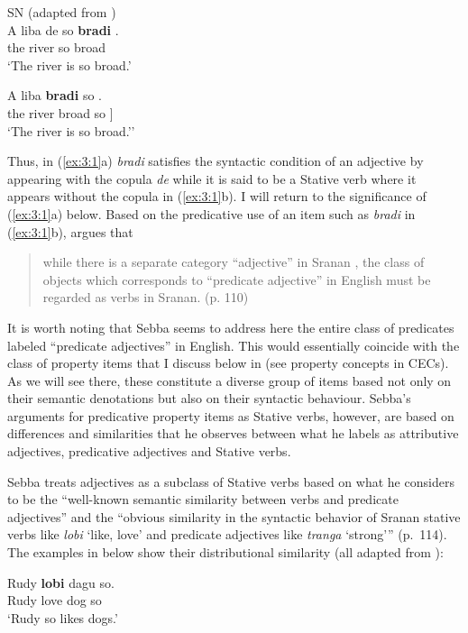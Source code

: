 \ea%
\label{ex:3:1}
SN (adapted from \citealt[112]{Sebba1986})\\
\ea
\gll A liba de {\ob} so \textbf{bradi} {\cb}.\\
    the river {\COP} {} so broad {}\\
\glt `The river is so broad.'

\ex
\gll A liba {\ob} \textbf{bradi} so {\cb}.\\
		the river {\ob} broad so ]\\
\glt `The river is so broad.'' \z \z

Thus, in (\ref{ex:3:1}a) \textit{bradi} satisfies the syntactic
condition of an adjective by appearing with the copula \textit{de}
while it is said to be a Stative verb where it appears without the
copula in (\ref{ex:3:1}b).  I will return to the significance of
(\ref{ex:3:1}a) below.  Based on the predicative use of an item such
as \textit{bradi} in (\ref{ex:3:1}b), \citet{Sebba1986} argues that

\begin{quote}
while there is a separate category “adjective” in Sranan , the class
of objects which corresponds to “predicate adjective” in English must
be regarded as verbs in Sranan. (p. 110)
\end{quote}

It is worth noting that Sebba seems to address here the entire class
of predicates labeled ``predicate adjectives'' in English.  This would
essentially coincide with the class of property items that I discuss
below in  (see  property concepts
in CECs).  As we will see there, these constitute a diverse group of
items based not only on their semantic denotations but also on their
syntactic behaviour.  Sebba’s arguments for predicative property items
as Stative verbs, however, are based on differences and similarities
that he observes between what he labels as attributive adjectives,
predicative adjectives and Stative verbs.

Sebba treats adjectives as a subclass of Stative verbs based on what
he considers to be the “well-known semantic similarity between verbs
and predicate adjectives” and the “obvious similarity in the syntactic
behavior of Sranan stative verbs like \textit{lobi} `like, love' and
predicate adjectives like \textit{tranga} `strong'” (p.~114).  The
examples in  below show their distributional similarity (all
adapted from \citealt[114]{Sebba1986}):

\ea%
\label{ex:3:2}
\ea
\gll Rudy \textbf{lobi} dagu so.\\
         Rudy love dog so\\
\glt `Rudy so likes dogs.'

